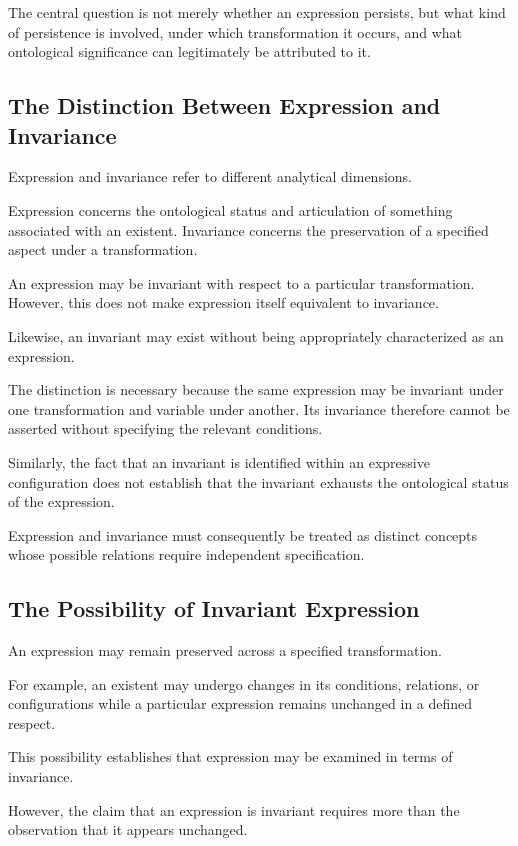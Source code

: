 The central question is not merely whether an
expression persists, but what kind of persistence
is involved, under which transformation it occurs,
and what ontological significance can legitimately
be attributed to it.

\subsection{The Distinction Between Expression and Invariance}

Expression and invariance refer to different
analytical dimensions.

Expression concerns the ontological status and
articulation of something associated with an existent.
Invariance concerns the preservation of a specified
aspect under a transformation.

An expression may be invariant with respect to
a particular transformation. However, this does
not make expression itself equivalent to invariance.

Likewise, an invariant may exist without being
appropriately characterized as an expression.

The distinction is necessary because the same
expression may be invariant under one transformation
and variable under another. Its invariance therefore
cannot be asserted without specifying the relevant
conditions.

Similarly, the fact that an invariant is identified
within an expressive configuration does not establish
that the invariant exhausts the ontological status
of the expression.

Expression and invariance must consequently be
treated as distinct concepts whose possible relations
require independent specification.

\subsection{The Possibility of Invariant Expression}

An expression may remain preserved across a
specified transformation.

For example, an existent may undergo changes in
its conditions, relations, or configurations while
a particular expression remains unchanged in
a defined respect.

This possibility establishes that expression
may be examined in terms of invariance.

However, the claim that an expression is invariant
requires more than the observation that it appears
unchanged.

